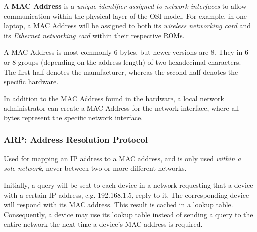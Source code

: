\documentclass{article}
\begin{document}
A \textbf{MAC Address} is a \textit{unique identifier assigned to network interfaces} to allow communication within the physical layer of the OSI model. For example, in one laptop, a MAC Address will be assigned to both its \textit{wireless networking card} and its \textit{Ethernet networking card} within their respective ROMs.

A MAC Address is most commonly 6 bytes, but newer versions are 8. They in 6 or 8 groups (depending on the address length) of two hexadecimal characters. The first half denotes the manufacturer, whereas the second half denotes the specific hardware.

In addition to the MAC Address found in the hardware, a local network administrator can create a MAC Address for the network interface, where all bytes represent the specific network interface.

\subsubsection{ARP: Address Resolution Protocol}

Used for mapping an IP address to a MAC address, and is only used \textit{within a sole network}, never between two or more different networks.

Initially, a query will be sent to each device in a network requesting that a device with a certain IP address, e.g. 192.168.1.5, reply to it. The corresponding device will respond with its MAC address. This result is cached in a lookup table. Consequently, a device may use its lookup table instead of sending a query to the entire network the next time a device's MAC address is required.
\end{document}
